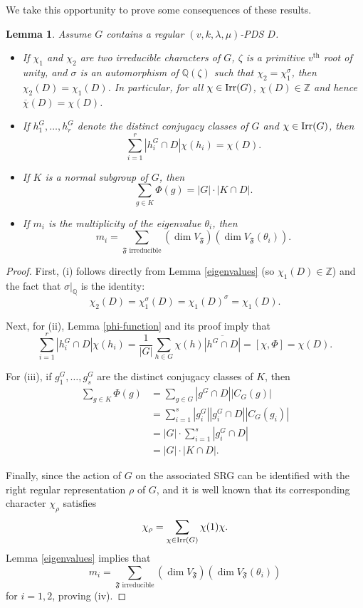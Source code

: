\documentclass[12pt]{amsproc} %
\newtheorem{lem}[thm]{Lemma}
\theoremstyle{definition}\newtheorem{defn}[thm]{Definition}
\theoremstyle{definition}\newtheorem{rem}[thm]{Remark}
\theoremstyle{definition}\newtheorem{ex}[thm]{Example}
\newcommand{\Irr}{{\rm Irr}}
\newcommand{\Q}{\mathbb{Q}}
\newcommand{\Z}{\mathbb{Z}}
\newcommand{\repF}{\mathfrak{F}}
\newcommand{\z}{\zeta}
\begin{document}
We take this opportunity to prove some consequences of these results.

\begin{lem}\label{lem:sumPhi}
Assume $G$ contains a regular $(v,k,\lambda, \mu)$-PDS $D$.
\begin{itemize}
    \item[(i)] If $\chi_1$ and $\chi_2$ are two irreducible characters of $G$, $\z$ is a primitive $v^\text{th}$ root of unity, and $\sigma$ is an automorphism of $\Q(\z)$ such that $\chi_2 = \chi_1^\sigma$, then $\chi_2(D) = \chi_1(D)$.  In particular, for all $\chi \in \Irr(G)$, $\chi(D) \in \Z$ and hence $\overline{\chi}(D) = \chi(D)$.
    \item[(ii)] If $h_1^G, \dots, h_r^G$ denote the distinct conjugacy classes of $G$ and $\chi \in \Irr(G)$, then
            \[ \sum_{i = 1}^r |h_i^G \cap D|\chi(h_i) = \chi(D).\]
    \item[(iii)] If $K$ is a normal subgroup of $G$, then
            \[ \sum_{g \in K} \Phi(g) = |G|\cdot|K \cap D|.\]        
    \item[(iv)] If $m_i$ is the multiplicity of the eigenvalue $\theta_i$, then 
    \[ m_i = \sum_{\repF \text{ irreducible}} (\dim V_\repF)(\dim V_\repF(\theta_i)).\]
    
\end{itemize}            
\end{lem}
        
\begin{proof}
First, (i) follows directly from Lemma \ref{eigenvalues} (so $\chi_1(D) \in \Z$) and the fact that $\sigma|_\Q$ is the identity:
 \[ \chi_2(D) = \chi_1^\sigma(D) = \chi_1(D)^\sigma = \chi_1(D).\]

Next, for (ii), Lemma \ref{phi-function} and its proof imply that
\[ \sum_{i = 1}^r |h_i^G \cap D|\chi(h_i) = \frac{1}{|G|}\sum_{h \in G} \chi(h) \overline{|h^G \cap D|} = [\chi, \Phi] = \chi(D).\]

For (iii), if $g_1^G, \dots, g_s^G$ are the distinct conjugacy classes of $K$, then
    \begin{align*}
         \sum_{g \in K} \Phi(g) &= \sum_{g \in G} |g^G \cap D||C_G(g)|\\
                                &= \sum_{i = 1}^s |g_i^G||g_i^G \cap D||C_G(g_i)|\\
                                &= |G| \cdot \sum_{i = 1}^s |g_i^G \cap D|\\
                                &= |G| \cdot |K \cap D|.
    \end{align*}

Finally, since the action of $G$ on the associated SRG can be identified with the right regular representation $\rho$ of $G$, and it is well known that its corresponding character $\chi_\rho$ satisfies
            \[ \chi_\rho = \sum_{\chi \in \Irr(G)} \chi(1) \chi.\]
Lemma \ref{eigenvalues} implies that
    \[ m_i = \sum_{\repF \text{ irreducible}} (\dim V_\repF)(\dim V_\repF(\theta_i))\]
for $i = 1,2$, proving (iv).    
\end{proof}
        
\end{document}
